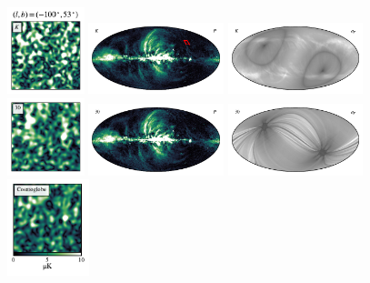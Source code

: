 \documentclass[twocolumn]{../../common/aa}
\begin{document}
\begin{figure}
	\centering
	\includegraphics[width=0.2\textwidth]{figures/K_square.pdf}
	\includegraphics[width=0.35\textwidth]{figures/Kband_polint.pdf}
	\includegraphics[width=0.35\textwidth]{figures/Kband_sigmaP.pdf}\\
	\includegraphics[width=0.2\textwidth]{figures/30_square.pdf}
	\includegraphics[width=0.35\textwidth]{figures/30GHz_polint.pdf}
	\includegraphics[width=0.35\textwidth]{figures/30GHz_sigmaP.pdf}\\
	\includegraphics[width=0.212\textwidth]{figures/CG_square.pdf}

\end{figure}
\end{document}
